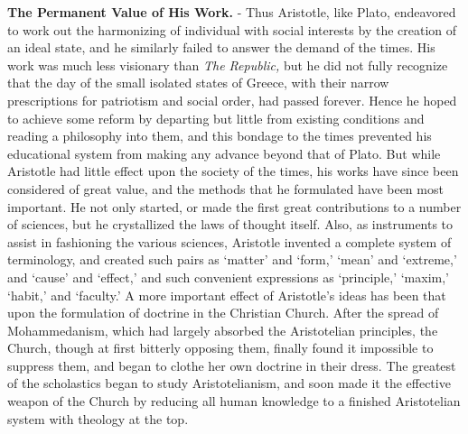 \documentclass[]{book}
\begin{document}
\textbf{The Permanent Value of His Work.} - Thus Aristotle, like Plato, endeavored to work out the harmonizing of individual with social interests by the creation of an ideal state, and he similarly failed to answer the demand of the times. His work was much less visionary than \emph{The Republic,} but he did not fully recognize that the day of the small isolated states of Greece, with their narrow prescriptions for patriotism and social order, had passed forever. Hence he hoped to achieve some reform by departing but little from existing conditions and reading a philosophy into them, and this bondage to the times prevented his educational system from making any advance beyond that of Plato. But while Aristotle had little effect upon the society of the times, his works have since been considered of great value, and the methods that he formulated have been most important. He not only started, or made the first great contributions to a number of sciences, but he crystallized the laws of thought itself. Also, as instruments to assist in fashioning the various sciences, Aristotle invented a complete system of terminology, and created such pairs as `matter' and `form,' `mean' and `extreme,' and `cause' and `effect,' and such convenient expressions as `principle,' `maxim,' `habit,' and `faculty.' A more important effect of Aristotle's ideas has been that upon the formulation of doctrine in the Christian Church. After the spread of Mohammedanism, which had largely absorbed the Aristotelian principles, the Church, though at first bitterly opposing them, finally found it impossible to suppress them, and began to clothe her own doctrine in their dress. The greatest of the scholastics began to study Aristotelianism, and soon made it the effective weapon of the Church by reducing all human knowledge to a finished Aristotelian system with theology at the top.
\end{document}
